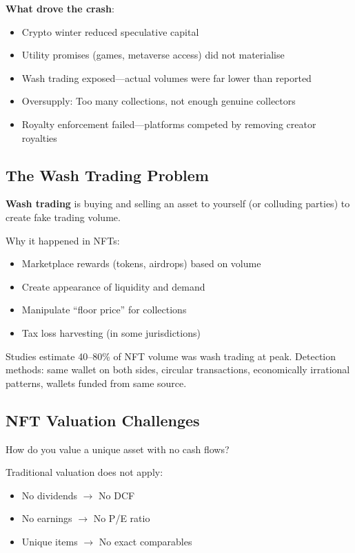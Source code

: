 \documentclass[11pt,a4paper]{article}
\newcommand{\keyword}[1]{\textbf{\textcolor{AccentOrange}{#1}}}
\begin{document}
\textbf{What drove the crash}:
\begin{itemize}
    \item Crypto winter reduced speculative capital
    \item Utility promises (games, metaverse access) did not materialise
    \item Wash trading exposed---actual volumes were far lower than reported
    \item Oversupply: Too many collections, not enough genuine collectors
    \item Royalty enforcement failed---platforms competed by removing creator royalties
\end{itemize}

\subsection{The Wash Trading Problem}

\keyword{Wash trading} is buying and selling an asset to yourself (or colluding parties) to create fake trading volume.

Why it happened in NFTs:
\begin{itemize}
    \item Marketplace rewards (tokens, airdrops) based on volume
    \item Create appearance of liquidity and demand
    \item Manipulate ``floor price'' for collections
    \item Tax loss harvesting (in some jurisdictions)
\end{itemize}

Studies estimate 40--80\% of NFT volume was wash trading at peak. Detection methods: same wallet on both sides, circular transactions, economically irrational patterns, wallets funded from same source.

\subsection{NFT Valuation Challenges}

How do you value a unique asset with no cash flows?

Traditional valuation does not apply:
\begin{itemize}
    \item No dividends $\rightarrow$ No DCF
    \item No earnings $\rightarrow$ No P/E ratio
    \item Unique items $\rightarrow$ No exact comparables
\end{itemize}
\end{document}
